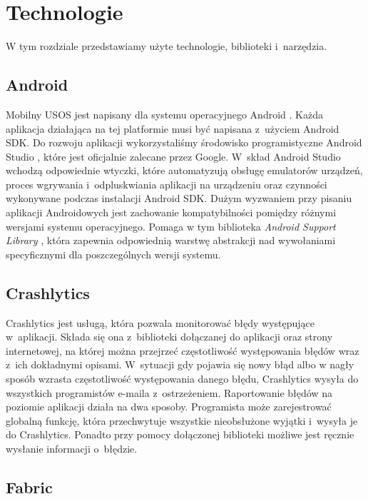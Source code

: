 \documentclass{pracamgr}
\begin{document}
\chapter{Technologie}

W tym rozdziale przedstawiamy użyte technologie, biblioteki i~narzędzia.

\section{Android}

Mobilny USOS jest napisany dla systemu operacyjnego Android \cite{android}.
Każda aplikacja działająca na tej platformie musi być napisana z~użyciem Android
SDK. Do rozwoju aplikacji wykorzystaliśmy środowisko programistyczne Android Studio
\cite{androidstudio}, które jest oficjalnie zalecane przez Google. W~skład Android Studio
wchodzą odpowiednie wtyczki, które automatyzują obsługę emulatorów urządzeń, proces
wgrywania i~odpluskwiania aplikacji na urządzeniu oraz czynności wykonywane podczas
instalacji Android SDK. Dużym wyzwaniem przy pisaniu aplikacji Androidowych jest
zachowanie kompatybilności pomiędzy różnymi wersjami systemu operacyjnego. Pomaga
w tym biblioteka \textit{Android Support Library} \cite{androidsupportlibrary},
która zapewnia odpowiednią warstwę abstrakcji nad wywołaniami specyficznymi dla
poszczególnych wersji systemu.

\section{Crashlytics}

Crashlytics \cite{crashlytics} jest usługą, która pozwala monitorować błędy
występujące w~aplikacji. Składa się ona z~biblioteki dołączanej do aplikacji
oraz strony internetowej, na której można przejrzeć częstotliwość występowania
błędów wraz z~ich dokładnymi opisami. W~sytuacji gdy pojawia się nowy błąd albo
w nagły sposób wzrasta częstotliwość występowania danego błędu, Crashlytics wysyła
do wszystkich programistów e-maila z~ostrzeżeniem. Raportowanie błędów na poziomie
aplikacji działa na dwa sposoby. Programista może zarejestrować globalną funkcję,
która przechwytuje wszystkie nieobsłużone wyjątki i~wysyła je do Crashlytics. Ponadto przy
pomocy dołączonej biblioteki możliwe jest ręcznie wysłanie informacji o~błędzie.

\section{Fabric}
\end{document}
